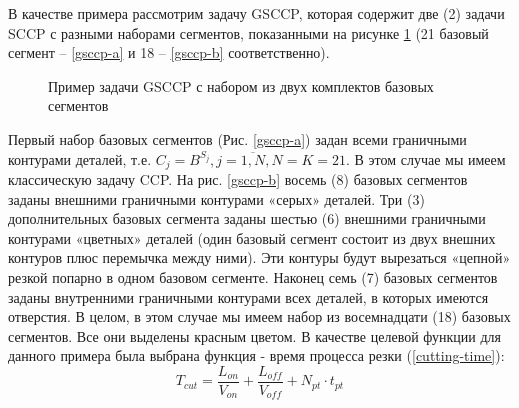 \documentclass[12pt,twoside]{report}
\begin{document}
В качестве примера рассмотрим задачу GSCCP,
которая содержит две (2)
задачи SCCP с разными наборами сегментов,
показанными на рисунке \ref{gsccp-both}
(21 базовый сегмент – \ref{gsccp-a}
и 18 – \ref{gsccp-b} соответственно).

\begin{figure}
  \centering
  \caption{Пример задачи GSCCP с набором из двух комплектов базовых сегментов}
  \label{gsccp-both}
\end{figure}

Первый набор базовых сегментов (Рис. \ref{gsccp-a})
задан всеми граничными контурами деталей, т.е.
$C_j = B^{S_j}, j=\overline{1,N}, N=K=21$.
В этом случае мы имеем классическую задачу CCP.
На рис. \ref{gsccp-b} восемь (8)
базовых сегментов заданы внешними граничными контурами «серых» деталей.
Три (3) дополнительных базовых сегмента заданы шестью (6)
внешними граничными контурами «цветных» деталей
(один базовый сегмент состоит из двух внешних контуров плюс перемычка между ними).
Эти контуры будут вырезаться «цепной» резкой попарно в одном базовом сегменте.
Наконец семь (7) базовых сегментов заданы внутренними
граничными контурами всех деталей,
в которых имеются отверстия.
В целом, в этом случае мы имеем набор из восемнадцати (18)
базовых сегментов.
Все они выделены красным цветом.
В качестве целевой функции для данного примера была выбрана функция - время процесса резки (\ref{cutting-time}):
$$
T_{cut} = \frac{L_{on}}{V_{on}} + \frac{L_{off}}{V_{off}} +N_{pt} \cdot t_{pt}
$$
\end{document}
